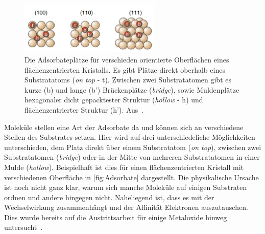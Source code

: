            \begin{figure}
                \centering
                \includegraphics[width=0.6\textwidth]{Adsorbate}
                \caption{Die Adsorbateplätze für verschieden orientierte Oberflächen eines flächenzentrierten Kristalls.
                Es gibt Plätze direkt oberhalb eines Substratatoms (\textit{on top} - t).
                Zwischen zwei Substratatomen gibt es kurze (b) und lange (b') Brückenplätze (\textit{bridge}), sowie Muldenplätze hexagonaler dicht gepacktester Struktur (\textit{hollow} - h) und flächenzentrierter Struktur (h'). Aus~\cite{Fauster}.}
                \label{fig:Adsorbate}
            \end{figure}
            Moleküle stellen eine Art der Adsorbate da und können sich an verschiedene Stellen des Substrates setzen.
            Hier wird auf drei unterschiedeliche Möglichkeiten unterschieden, dem Platz direkt über einem Substratatom (\textit{on top}), zwischen zwei Substratatomen (\textit{bridge}) oder in der Mitte von mehreren Substratatomen in einer Mulde (\textit{hollow}).
            Beispielhaft ist dies für einen flächenzentrierten Kristall mit verschiedenen Oberfläche in \autoref{fig:Adsorbate} dargestellt.
            Die physikalische Ursache ist noch nicht ganz klar, warum sich manche Moleküle auf einigen Substraten ordnen und andere hingegen nicht.
            Naheliegend ist, dass es mit der Wechselwirkung zusammenhängt und der Affinität Elektronen auszutauschen.
            Dies wurde bereits auf die Austrittsarbeit für einige Metaloxide hinweg untersucht~\cite{greiner_universal_2012}.

